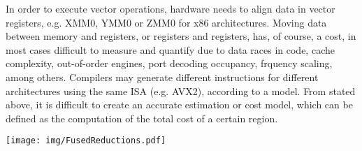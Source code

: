 In order to execute vector operations, hardware needs to align data in vector 
registers, e.g. XMM0, YMM0 or ZMM0 for x86 architectures. Moving data between 
memory and registers, or registers and registers, has, of course, a cost, 
in most cases difficult to measure and quantify due to data races in code, 
cache complexity, out-of-order engines, port decoding occupancy, frquency 
scaling, among others. Compilers may generate different instructions for 
different architectures using the same ISA (e.g. AVX2), according to a model. 
From stated above, it is difficult to create an accurate estimation or cost 
model, which can be defined as the computation of the total cost of a certain 
region.

\begin{figure*}[ht]
	\centering
	\texttt{[image: img/FusedReductions.pdf]}
	\caption{}
	\label{fig:FusedReductions}
\end{figure*}